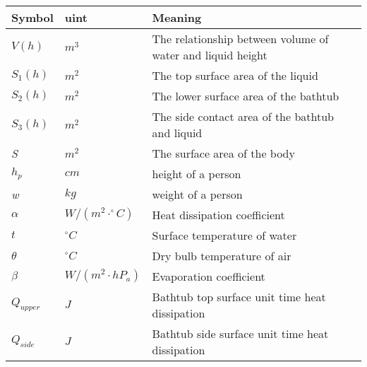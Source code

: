 \documentclass{mcmthesis}
\begin{document}
\begin{table}[H]
        \setlength{\abovecaptionskip}{0pt}
        \setlength{\belowcaptionskip}{0pt}
         \\
        \begin{tabular}{p{1.8cm}|p{2.2cm}|p{9cm}}
        \hline
        \rowcolor[gray]{0.9}\bf{Symbol}	&\bf{uint}      &\bf{Meaning}\\
        \hline
        $V(h)$			& $m^3  $		 & The relationship between volume of water and liquid height \\
        $S_{1}(h)$		& $m^2  $		 & The top surface area of the liquid 	\\
        $S_{2}(h)$		& $m^2  $		 & The lower surface area of the bathtub 	\\
        $S_{3}(h)$		& $m^2  $		 & The side contact area of the bathtub and liquid 	\\
        \emph{S}	& $m^2  $		 & The surface area of the body\\
        ${h_{p}}$	& $cm	$        & height of a person \\
        \emph{w}	& $kg	$        & weight of a person \\
        $\alpha$		& $ W/(m^{2}\cdot^{\circ}C)  $		 & Heat dissipation coefficient\\
        $t$		& $ ^{\circ}C  $		 & Surface temperature of water \\
        $\theta$		& $^{\circ}C$		 & Dry bulb temperature of air\\
        $\beta$		& $W/(m^{2}\cdot hP_{a})$		 & Evaporation coefficient\\
        $Q_{upper}$		& $J$		 & Bathtub top surface unit time heat dissipation\\
		$Q_{side}$		& $J$		 & Bathtub side surface unit time heat dissipation\\
		        \hline
        \end{tabular}
        \end{table}

\end{document}

